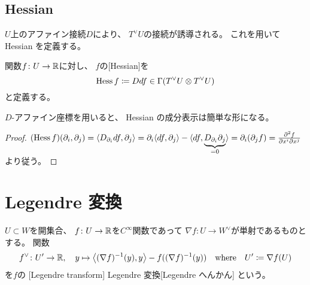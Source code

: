 \documentclass[report]{jlreq}
\begin{document}
\subsection{Hessian}

$U$上のアファイン接続$D$により、
$T^\vee U$の接続が誘導される。
これを用いて Hessian を定義する。

\begin{definition}[Hessian]
    \smooth 関数$f \colon U \to \mathbb{R}$に対し、
    $f$の[Hessian]を
    \begin{equation}
        \operatorname{Hess} f \coloneqq Ddf
            \in \Gamma(T^\vee U \otimes T^\vee U)
    \end{equation}
    と定義する。
\end{definition}

$D$-アファイン座標を用いると、
Hessian の成分表示は簡単な形になる。


\begin{proof}
    $(\operatorname{Hess} f)(\partial_i, \partial_j)
        = \langle D_{\partial_i} df, \partial_j \rangle
        = \partial_i \langle df, \partial_j \rangle
            - \langle
                df,
                \underbrace{D_{\partial_i} \partial_j}_{= 0}
            \rangle
        = \partial_i (\partial_j f)
        = \frac{\partial^2 f}{\partial x^i \partial x^j}$
    より従う。
\end{proof}

%
\section{Legendre 変換}


\begin{definition}[Legendre 変換]
    $U \subset W$を開集合、
    $f \colon U \to \mathbb{R}$を$C^\infty$関数であって
    $\nabla f \colon U \to W^\vee$が単射であるものとする。
    関数
    \begin{equation}
        f^\vee \colon U' \to \mathbb{R},
            \quad
            y
            \mapsto
            \left\langle{(\nabla f)^{-1}(y)},{y}\right\rangle - f((\nabla f)^{-1}(y))
            \quad
            \text{where}
            \quad
            U' \coloneqq \nabla f(U)
    \end{equation}
    を$f$の
    [Legendre transform]
        {Legendre 変換}[Legendre へんかん]
    という。
\end{definition}
\end{document}
